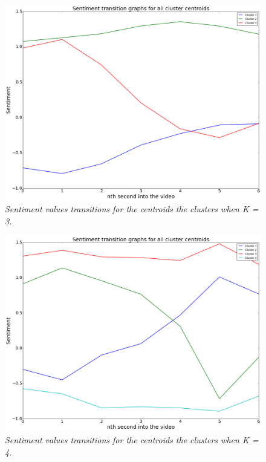 \begin{figure}
\centering
\includegraphics[width=\columnwidth]{plots/3_clusters_transitions}
\caption{\textsl{Sentiment values transitions for the centroids the clusters when K = 3.}}
\label{fig:3_clusters}
\end{figure}

\begin{figure}
\centering
\includegraphics[width=\columnwidth]{plots/4_clusters_transitions}
\caption{\textsl{Sentiment values transitions for the centroids the clusters when K = 4.}}
\label{fig:4_clusters}
\end{figure}

